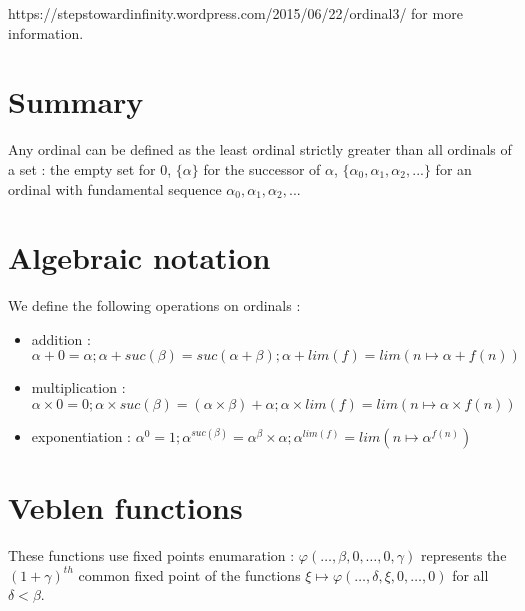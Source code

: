 \documentclass[10pt]{article}
\begin{document}
https://stepstowardinfinity.wordpress.com/2015/06/22/ordinal3/ for more information. 




\section{Summary}

Any ordinal can be defined as the least ordinal strictly greater than all ordinals of a set : the empty set for 0, \(\lbrace \alpha \rbrace\) for the successor of \( \alpha \),  \(\lbrace \alpha_0,\alpha_1,\alpha_2,...\rbrace\) for an ordinal with fundamental sequence \(\alpha_0, \alpha_1, \alpha_2, ...\)

\vspace{-0.7cm}

\section{Algebraic notation}
\vspace{-0.4cm}
We define the following operations on ordinals :
\vspace{-0.4cm}
\smallskip
\begin{itemize}
     \setlength{\itemsep}{1pt}
     \setlength{\parskip}{0pt}
     \setlength{\parsep}{0pt}
\item addition : \( \alpha+0=\alpha ; \alpha+suc(\beta)=suc(\alpha+\beta); \alpha+lim(f)=lim(n \mapsto \alpha+f(n)) \)
\vspace{-0.1cm}
\item multiplication : \( \alpha \times 0 = 0 ; \alpha \times suc(\beta) = (\alpha \times \beta) + \alpha ; \alpha \times lim(f) = lim (n \mapsto \alpha \times f(n)) \)
\vspace{-0.1cm}
\item exponentiation : \( \alpha^0 = 1 ; \alpha^{suc(\beta)} = \alpha^\beta \times \alpha ; \alpha^{lim(f)} = lim (n \mapsto \alpha^{f(n)}) \)
\end{itemize}
\vspace{-0.8cm}

\section{Veblen functions}
\vspace{-0.4cm}
These functions use fixed points enumaration : \(\varphi(\ldots,\beta,0,\ldots,0,\gamma) \) represents the \((1+\gamma)^{th}\) common fixed point of the functions \( \xi \mapsto \varphi(\ldots,\delta,\xi,0,\ldots,0)\) for all \(\delta < \beta\).
\vspace{-0.6cm}
\end{document}
